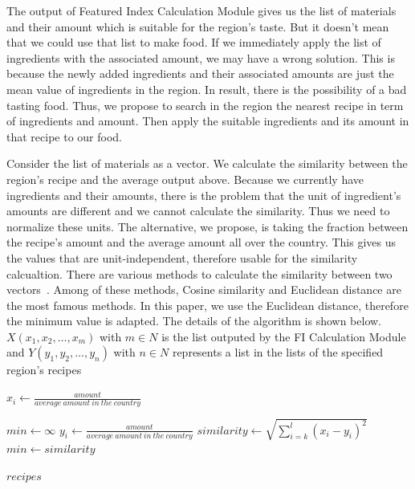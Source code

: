 \documentclass{sig-alternate}
\begin{document}
The output of Featured Index Calculation Module gives us the list of materials and their amount which is suitable for the region's taste. But it doesn't mean that we could use that list to make food. If we immediately apply the list of ingredients with the associated amount, we may have a wrong solution. This is because the newly added ingredients and their associated amounts are just the mean value of ingredients in the region. In result, there is the possibility of a bad tasting food. Thus, we propose to search in the region the nearest recipe in term of ingredients and amount. Then apply the suitable ingredients and its amount in that recipe to our food.        

Consider the list of materials as a vector. We calculate the similarity between the region's recipe and the average output above. Because we currently have ingredients and their amounts, there is the problem that the unit of ingredient's amounts are different and we cannot calculate the similarity. Thus we need to normalize these units. The alternative, we propose, is taking the fraction between the recipe's amount and the average amount all over the country. This gives us the values that are unit-independent, therefore usable for the similarity calcualtion. There are various methods to calculate the similarity between two vectors~\cite{cosine,euclidean,Qian:2004:SEC:967900.968151}. Among of these methods, Cosine similarity and Euclidean distance are the most famous methods. In this paper, we use the Euclidean distance, therefore the minimum value is adapted. The details of the algorithm is shown below. $X(x_1,x_2,\ldots,x_m)$ with $m \in N $ is the list outputed by the FI Calculation Module and $Y(y_1,y_2,\ldots,y_n)$ with $n \in N $ represents a list in the lists of the specified region's recipes 


\begin{algorithmic}

\State $ x_i \gets \frac{\displaystyle amount}{\displaystyle average\ amount\ in\ the\ country}$
\EndFor

\State $min \gets \infty $
\State $ y_i \gets \frac{\displaystyle amount}{\displaystyle average\ amount\ in\ the\ country}$
\EndFor
\State $ similarity \gets \sqrt{\displaystyle \sum^l_{i=k}{(x_i-y_i)^2}}$
\State $ min \gets similarity $
\EndIf
\EndFor


\Return $recipes$



\end{algorithmic}
\end{document}
